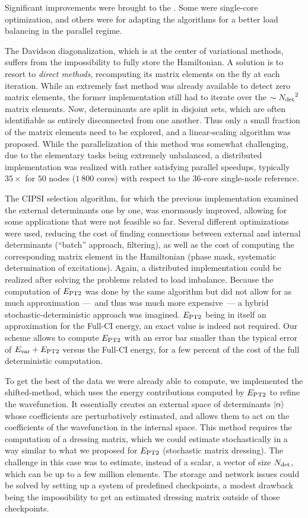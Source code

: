 \documentclass[12pt,a4paper]{report}
\begin{document}
Significant improvements were brought to the \QP. Some were single-core optimization, and others were for adapting the algorithms for a better load balancing in the
parallel regime.

The Davidson diagonalization, which is at the center of variational methods, suffers from the impossibility to fully store the Hamiltonian. A solution is to resort to \emph{direct methods}, recomputing its matrix elements on the fly at each iteration. While an extremely fast method was already available to detect zero matrix elements,\cite{Scemama_2013} the former implementation still had to iterate over the $\sim {N_\text{det}}^2$ matrix elements. Now, determinants are split in disjoint sets, which are often identifiable as entirely disconnected from one another. Thus only a small fraction of the matrix elements need to be explored, and a linear-scaling algorithm was proposed.
While the parallelization of this method was somewhat challenging, due to the elementary tasks being extremely unbalanced, a distributed implementation was realized with rather satisfying parallel speedups, typically $35\times$ for $50$ nodes ($1~800$ cores) with respect to the $36$-core single-node reference.

The CIPSI selection algorithm, for which the previous implementation examined the external determinants one by one, was enormously improved, allowing for some applications that were not feasible so far.\cite{Scemama_2018,1806.05115} Several different optimizations were used, reducing the cost of finding connections between external and internal determinants (``batch'' approach, filtering), as well as the cost of computing the corresponding matrix element in the Hamiltonian (phase mask, systematic determination of excitations). Again, a distributed implementation could be realized after 
solving the problems related to load imbalance.
Because the computation of $E_\text{PT2}$ was done by the same algorithm but did not allow for as much approximation ---~and thus was much more expensive~--- a hybrid stochastic-deterministic approach was imagined. $E_\text{PT2}$ being in itself an approximation for the Full-CI energy, an exact value is indeed not required. Our scheme allows to compute $E_\text{PT2}$ with an error bar smaller than the typical error of $E_{\text{var}} + E_\text{PT2}$ versus the Full-CI energy, for a few percent of the cost of the full deterministic computation.

To get the best of the data we were already able to compute, we implemented the shifted-\Bk method, which uses the energy contributions computed by $E_\text{PT2}$ to refine the wavefunction. It essentially creates an external space of determinants ${\ket{\alpha}}$ whose coefficients are perturbatively estimated, and allows them to act on the coefficients of the wavefunction in the internal space. This method requires the computation of a dressing matrix, which we could estimate stochastically in a way similar to what we proposed for $E_\text{PT2}$ (stochastic matrix dressing).
The challenge in this case was to estimate, instead of a scalar, a vector of size ${N_\text{det}}$, which can be up to a few million elements. The storage and network issues could be solved by setting up a system of predefined checkpoints, a modest drawback being the impossibility to get an estimated dressing matrix outside of those checkpoints.
\end{document}

